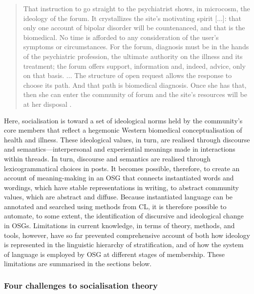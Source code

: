 \begin{quote}\small\singlespacing
That instruction to go straight to the psychiatrist shows, in microcosm, the ideology of the \gls{forum}. It crystallizes the site's motivating spirit [...]: that only one account of bipolar disorder will be countenanced, and that is the biomedical. No time is afforded to any consideration of the user's symptoms or circumstances. For the \gls{forum}, diagnosis must be in the hands of the psychiatric profession, the ultimate authority on the illness and its treatment; the forum offers support, information and, indeed, advice, only on that basis. ... The structure of open request allows the response to choose its path. And that path is biomedical diagnosis. Once she has that, then she can enter the community of \gls{forum}  and the site's resources will be at her disposal \parencite*[pp.~940--941]{vayreda_social_2009}.
\end{quote}
%
Here, socialisation is toward a set of ideological norms held by the community's core members that reflect a hegemonic Western biomedical conceptualisation of health and illness. These ideological values, in turn, are realised through discourse and semantics---interpersonal and experiential meanings made in interactions within \glspl{thread}. In turn, discourse and semantics are realised through lexicogrammatical choices in  \glspl{post}. It becomes possible, therefore, to create an account of meaning\hyp{}making in an \gls{OSG} that connects instantiated words and wordings, which have stable representations in writing, to abstract community values, which are abstract and diffuse. Because instantiated language can be annotated and searched using methods from \gls{CL}, it is therefore possible to automate, to some extent, the identification of discursive and ideological change in \glspl{OSG}. Limitations in current knowledge, in terms of theory, methods, and tools, however, have so far prevented comprehensive account of both how ideology is represented in the linguistic hierarchy of stratification, and of how the system of language is employed by \gls{OSG}  at different stages of membership. These limitations are summarised in the sections below.

\subsubsection{Four challenges to socialisation theory}

